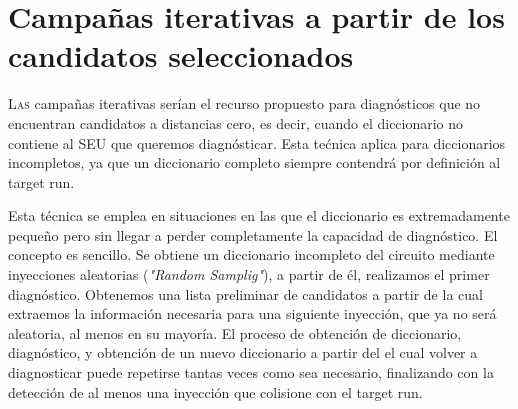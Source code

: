 \chapter{Campañas iterativas a partir de los candidatos seleccionados}
\label{ch:CampanasIterativas}

\lettrine[lraise=-0.1, lines=2, loversize=0.2]{L}{as} campañas iterativas serían
el recurso propuesto para diagnósticos que no encuentran candidatos a distancias
cero, es decir, cuando el diccionario no contiene al \gls{SEU} que queremos
diagnósticar. Esta tećnica aplica para diccionarios incompletos, ya que un
diccionario completo siempre contendrá por definición al target run.

Esta técnica se emplea en situaciones en las que el diccionario es extremadamente 
pequeño pero sin llegar a perder completamente la capacidad de diagnóstico. El
concepto es sencillo. Se obtiene un diccionario incompleto del circuito mediante
inyecciones aleatorias (\textit{"Random Samplig"}), a partir de él, realizamos el
primer diagnóstico. Obtenemos una lista preliminar de candidatos a partir de la
cual extraemos la información necesaria para una siguiente inyección, que ya no 
será aleatoria, al menos en su mayoría. El proceso de obtención de diccionario,
diagnóstico, y obtención de un nuevo diccionario a partir del el cual volver a
diagnosticar puede repetirse tantas veces como sea necesario, finalizando con la
detección de al menos una inyección que colisione con el target run.


